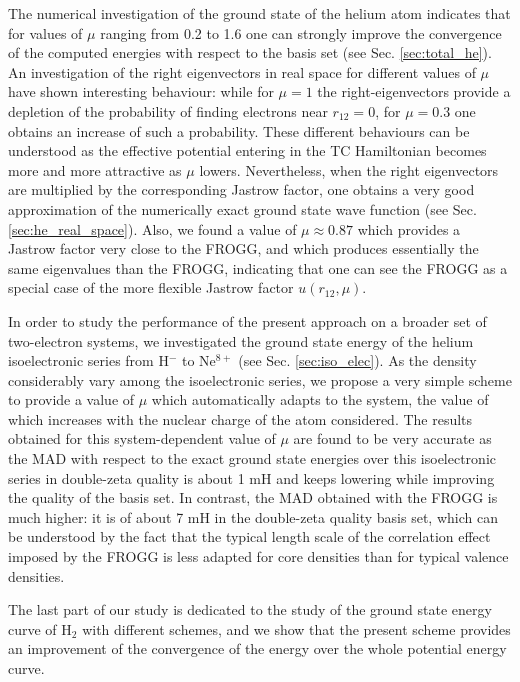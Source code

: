 \documentclass[aip,jcp,reprint,noshowkeys,superscriptaddress,twocolumn]{revtex4-1}
\begin{document}
The numerical investigation of the ground state of the helium atom indicates that for values of $\mu$ ranging from 0.2 to 1.6 one can strongly improve the convergence of the computed energies with respect to the basis set (see Sec. \ref{sec:total_he}). An investigation of the right eigenvectors in real space for different values of $\mu$ have shown interesting behaviour: while for $\mu=1$ the right-eigenvectors provide a depletion of the probability of finding electrons near $r_{12}=0$, for $\mu=0.3$ one obtains an increase of such a probability. These different behaviours can be understood as the effective potential entering in the TC Hamiltonian becomes more and more attractive as $\mu$ lowers. 
Nevertheless, when the right eigenvectors are multiplied by the corresponding Jastrow factor, one obtains a very good approximation of the numerically exact ground state wave function (see Sec. \ref{sec:he_real_space}).  
Also, we found a value of $\mu \approx 0.87$ which provides a Jastrow factor very close to the FROGG, and which produces essentially the same eigenvalues than the FROGG, indicating that one can see the FROGG as a special case of the more flexible Jastrow factor $u(r_{12},\mu)$. 

In order to study the performance of the present approach on a broader set of two-electron systems, we investigated the ground state energy of the helium isoelectronic series from H$^-$ to Ne$^{8+}$ (see Sec. \ref{sec:iso_elec}). 
As the density considerably vary among the isoelectronic series, we propose a very simple scheme to provide a value of $\mu$ which automatically adapts to the system, the value of which increases with the nuclear charge of the atom considered. The results obtained for this system-dependent value of $\mu$ are found to be very accurate as the MAD with respect to the exact ground state energies over this isoelectronic series in double-zeta quality is about 1 mH and keeps lowering while improving the quality of the basis set. In contrast, the MAD obtained with the FROGG is much higher: it is of about 7 mH in the double-zeta quality basis set, which can be understood by the fact that the typical length scale of the correlation effect imposed by the FROGG is less adapted for core densities than for typical valence densities.  

The last part of our study is dedicated to the study of the ground state energy curve of H$_2$ with different schemes, and we show that the present scheme provides an improvement of the convergence of the energy over the whole potential energy curve. 
\end{document}
